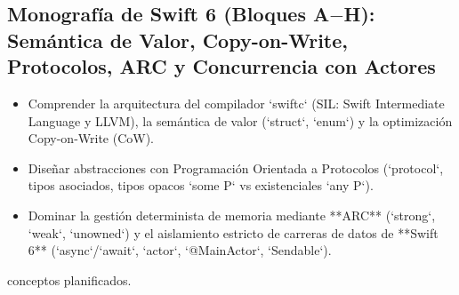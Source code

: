 \documentclass{book}
\begin{document}
\subsection*{\checkmark Monografía de Swift 6 (Bloques A\(-\)H): Semántica de Valor, Copy-on-Write, Protocolos, ARC y Concurrencia con Actores}
\begin{itemize}
\item Comprender la arquitectura del compilador `swiftc` (SIL: Swift Intermediate Language y LLVM), la semántica de valor (`struct`, `enum`) y la optimización Copy-on-Write (CoW).
\item Diseñar abstracciones con Programación Orientada a Protocolos (`protocol`, tipos asociados, tipos opacos `some P` vs existenciales `any P`).
\item Dominar la gestión determinista de memoria mediante **ARC** (`strong`, `weak`, `unowned`) y el aislamiento estricto de carreras de datos de **Swift 6** (`async`/`await`, `actor`, `@MainActor`, `Sendable`).
\end{itemize}
 conceptos planificados.
\backmatter
\end{document}
